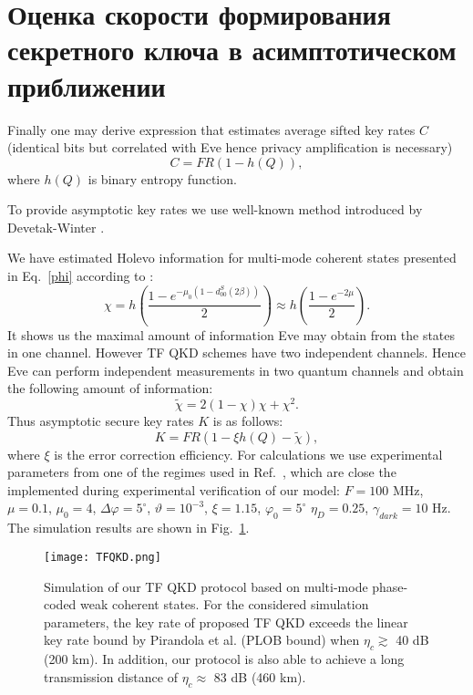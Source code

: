 \pagebreak

\section{Оценка скорости формирования секретного ключа в асимптотическом приближении} \label{ch:ch6/sec2}

Finally one may derive expression that estimates average sifted key rates $C$ (identical bits but correlated with Eve hence privacy amplification is necessary)
\begin{equation}
    C=FR(1-h(Q)),
\end{equation}
where $h(Q)$ is binary entropy function.

To provide asymptotic key rates we use well-known method introduced by Devetak-Winter \cite{devetak2005distillation}.

We have estimated Holevo information for multi-mode coherent states presented in Eq.~\ref{phi} according to \cite{kozubov2019finite}:
\begin{equation}
    \chi=h\left(\frac{1-e^{-\mu_0(1-d^S_{00}(2\beta))}}{2}\right)\approx h\left(\frac{1-e^{-2\mu}}{2}\right).
\end{equation}
It shows us the maximal amount of information Eve may obtain from the states in one channel. However TF QKD schemes have two independent channels. Hence Eve can perform independent measurements in two quantum channels and obtain the following amount of information:
\begin{equation}
    \tilde{\chi}=2(1-\chi)\chi+\chi^2.
\end{equation}
Thus asymptotic secure key rates $K$ is as follows:
\begin{equation}
     K=FR(1-\xi h(Q)-\tilde{\chi}),
\end{equation}
where $\xi$ is the error correction efficiency. 
For calculations we use experimental parameters from one of the regimes used in Ref.~\cite{Gleim16,Miroshnichenko18}, which are close the implemented during experimental verification of our model: $F=100$ MHz, $\mu=0.1$, $\mu_0=4$, $\Delta\varphi=5^{\circ}$, $\vartheta=10^{-3}$, $\xi=1.15$, $\varphi_0=5^{\circ}$ $\eta_D=0.25$, $\gamma_{dark}= 10$ Hz. The simulation results are shown in Fig.~\ref{fig:fig2}.

\begin{figure}
	\texttt{[image: TFQKD.png]}
	\caption{ Simulation of our TF QKD protocol based on multi-mode phase-coded weak coherent states. For the considered simulation parameters, the key rate of proposed TF QKD exceeds the linear key rate bound by Pirandola et al. (PLOB bound) \cite{pirandola2017fundamental} when $\eta_c \gtrsim$ 40 dB (200 km). In addition, our protocol is also able to achieve a long transmission distance of $\eta_c\approx$ 83 dB (460 km). %
	}
	\label{fig:fig2}
\end{figure}


